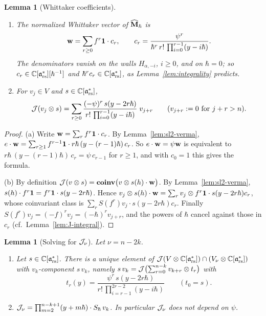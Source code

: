 \documentclass{article}
\theoremstyle{plain}
\newtheorem{lemma}[theorem]{Lemma}
\theoremstyle{definition}
\theoremstyle{remark}
\numberwithin{equation}{section}
\begin{document}
\begin{lemma}[Whittaker coefficients]\label{lem:sl2-whittaker}
\begin{enumerate}[label=(\alph*)]
\item The normalized Whittaker vector of $\widehat{\mathbf M}_\hbar$ is
\[
\mathbf w=\sum_{r\ge0}f^r\mathbf 1\cdot c_r,\qquad c_r=\frac{\psi^r}{\hbar^r\,r!\,\prod_{i=0}^{r-1}(y-i\hbar)} .
\]
The denominators vanish on the walls $H_{\alpha,-i}$, $i\ge0$, and on $\hbar=0$; so $c_r\in\mathbb{C}[\mathfrak{a}^*_{\mathrm{rs}}][\hbar^{-1}]$ and $\hbar^rc_r\in\mathbb{C}[\mathfrak{a}^*_{\mathrm{rs}}]$, as Lemma~\ref{lem:integrality} predicts.
\item For $v_j\in V$ and $s\in\mathbb{C}[\mathfrak{a}^*_{\mathrm{rs}}]$,
\[
\mathcal J(v_j\otimes s)=\sum_{r\ge0}\frac{(-\psi)^r\,s(y-2r\hbar)}{r!\,\prod_{i=0}^{r-1}(y-i\hbar)}\;v_{j+r}\qquad(v_{j+r}:=0\text{ for }j+r>n).
\]
\end{enumerate}
\end{lemma}

\begin{proof}
(a) Write $\mathbf w=\sum_rf^r\mathbf 1\cdot c_r$. By Lemma~\ref{lem:sl2-verma}, $e\cdot\mathbf w=\sum_{r\ge1}f^{r-1}\mathbf 1\cdot r\hbar\,(y-(r-1)\hbar)\,c_r$. So $e\cdot\mathbf w=\psi\mathbf w$ is equivalent to $r\hbar\,(y-(r-1)\hbar)\,c_r=\psi\,c_{r-1}$ for $r\ge1$, and with $c_0=1$ this gives the formula.

(b) By definition $\mathcal J(v\otimes s)=\operatorname{\mathbf{coinv}}\bigl(v\otimes s(h)\cdot\mathbf w\bigr)$. By Lemma~\ref{lem:sl2-verma}, $s(h)\cdot f^r\mathbf 1=f^r\mathbf 1\cdot s(y-2r\hbar)$. Hence $v_j\otimes s(h)\cdot\mathbf w=\sum_rv_j\otimes f^r\mathbf 1\cdot s(y-2r\hbar)c_r$, whose coinvariant class is $\sum_rS(f^r)v_j\cdot s(y-2r\hbar)c_r$. Finally $S(f^r)v_j=(-f)^rv_j=(-\hbar)^rv_{j+r}$, and the powers of $\hbar$ cancel against those in $c_r$ (cf.\ Lemma~\ref{lem:J-integral}).
\end{proof}

\begin{lemma}[Solving for $\mathcal J_\nu$]\label{lem:sl2-J}
Let $\nu=n-2k$.
\begin{enumerate}[label=(\alph*)]
\item Let $s\in\mathbb{C}[\mathfrak{a}^*_{\mathrm{rs}}]$. There is a unique element of $\mathcal J(V\otimes\mathbb{C}[\mathfrak{a}^*_{\mathrm{rs}}])\cap(V_\nu\otimes\mathbb{C}[\mathfrak{a}^*_{\mathrm{rs}}])$ with $v_k$-component $s\,v_k$, namely $s\,v_k=\mathcal J\bigl(\sum_{r=0}^{n-k}v_{k+r}\otimes t_r\bigr)$ with
\[
t_r(y)=\frac{\psi^r\,s(y-2r\hbar)}{r!\,\prod_{i=r-1}^{2r-2}(y-i\hbar)}\qquad(t_0=s).
\]
\item $\mathcal J_\nu=\prod_{m=2}^{n-k+1}(y+m\hbar)\cdot S_\hbar\,v_k$. In particular $\mathcal J_\nu$ does not depend on $\psi$.
\end{enumerate}
\end{lemma}
\end{document}
